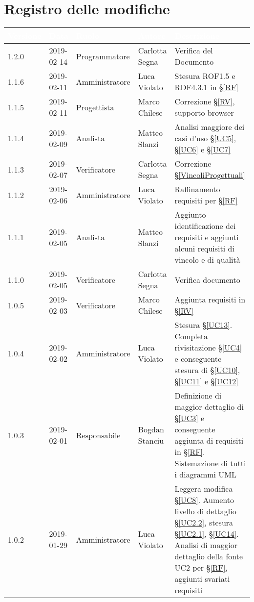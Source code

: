 \section*{Registro delle modifiche}

\begin{center}
\begin{longtable}[c]{|m{}|m{}|m{}|m{}|p{}|}
\hline
\rowcolor{bluelogo}\textbf{\textcolor{white}{Versione}} & \textbf{\textcolor{white}{Data}} & \textbf{\textcolor{white}{Ruolo}} & \textbf{\textcolor{white}{Autore}} & \textbf{\textcolor{white}{Descrizione}} \\
\hline \hline
\endhead
\rowcolor{grigio} 1.2.0 & 2019-02-14 & Programmatore & Carlotta Segna & Verifica del Documento\\
\hline
1.1.6 & 2019-02-11 & Amministratore & Luca Violato & Stesura ROF1.5 e RDF4.3.1 in §\ref{RF}\\
\hline
\rowcolor{grigio}1.1.5 & 2019-02-11 & Progettista & Marco Chilese & Correzione §\ref{RV}, supporto browser\\
\hline
1.1.4 & 2019-02-09 & Analista & Matteo Slanzi & Analisi maggiore dei casi d'uso §\ref{UC5}, §\ref{UC6} e §\ref{UC7}\\
\hline
\rowcolor{grigio} 1.1.3 & 2019-02-07 & Verificatore & Carlotta Segna & Correzione §\ref{VincoliProgettuali}\\
\hline
1.1.2 & 2019-02-06 & Amministratore & Luca Violato & Raffinamento requisiti per §\ref{RF}\\
\hline
\rowcolor{grigio}1.1.1 & 2019-02-05 & Analista & Matteo Slanzi & Aggiunto identificazione dei requisiti e  aggiunti alcuni requisiti di vincolo e di qualità \\
\hline
1.1.0 & 2019-02-05 & Verificatore & Carlotta Segna & Verifica documento \\
\hline
\rowcolor{grigio}1.0.5 & 2019-02-03 & Verificatore & Marco Chilese & Aggiunta requisiti in §\ref{RV}\\
\hline
1.0.4 & 2019-02-02 & Amministratore & Luca Violato & Stesura §\ref{UC13}. Completa rivisitazione §\ref{UC4} e conseguente stesura di §\ref{UC10}, §\ref{UC11} e §\ref{UC12}\\
\hline
\rowcolor{grigio}1.0.3 & 2019-02-01 & Responsabile & Bogdan Stanciu &  Definizione di maggior dettaglio di §\ref{UC3} e conseguente aggiunta di requisiti in §\ref{RF}. Sistemazione di tutti i diagrammi UML \\
\hline
1.0.2 & 2019-01-29 & Amministratore & Luca Violato & Leggera modifica §\ref{UC8}. Aumento livello di dettaglio §\ref{UC2.2}, stesura §\ref{UC2.1}, §\ref{UC14}. Analisi di maggior dettaglio della fonte UC2 per §\ref{RF}, aggiunti svariati requisiti\\

\end{longtable}
\end{center}
